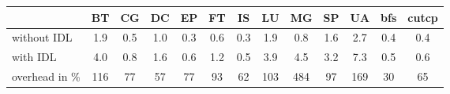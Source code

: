 \addtolength{\tabcolsep}{-.3em}
\begin{table}[t]
  \scriptsize
  \begin{tabular}{lcccccccccccc}
  \toprule
  & \hspace{.631mm}BT\hspace{.631mm}
  & \hspace{.631mm}CG\hspace{.631mm}
  & \hspace{.631mm}DC\hspace{.631mm}
  & \hspace{.631mm}EP\hspace{.631mm}
  & \hspace{.631mm}FT\hspace{.631mm}
  & \hspace{.631mm}IS\hspace{.631mm}
  & \hspace{.631mm}LU\hspace{.631mm}
  & \hspace{.631mm}MG\hspace{.631mm}
  & \hspace{.631mm}SP\hspace{.631mm}
  & \hspace{.631mm}UA\hspace{.631mm}
  & \hspace{.631mm}bfs\hspace{.631mm}
  & \hspace{.631mm}cutcp\hspace{.631mm} \\
  \midrule
without IDL    & 1.9 & 0.5 & 1.0 & 0.3 & 0.6 & 0.3 & 1.9 & 0.8 & 1.6 & 2.7 & 0.4 & 0.4 \\[0.25em]
with IDL       & 4.0 & 0.8 & 1.6 & 0.6 & 1.2 & 0.5 & 3.9 & 4.5 & 3.2 & 7.3 & 0.5 & 0.6 \\[0.75em]
overhead in \% & 116 &  77 &  57 &  77 &  93 &  62 & 103 & 484 &  97 & 169 &  30 &  65 \\

  \bottomrule
\end{tabular}

\vspace{2em}


\end{table}
